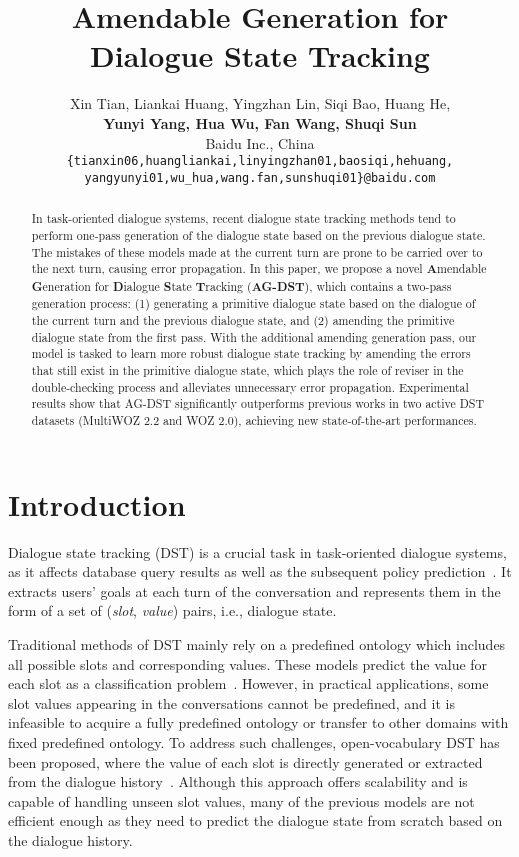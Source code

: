 \documentclass[11pt]{article}
\title{Amendable Generation for Dialogue State Tracking}
\author{Xin Tian, Liankai Huang, Yingzhan Lin, Siqi Bao, Huang He,\\
  \textbf{Yunyi Yang, Hua Wu, Fan Wang, Shuqi Sun} \\
  Baidu Inc., China \\
  \texttt{\{tianxin06,huangliankai,linyingzhan01,baosiqi,hehuang,} \\
  \texttt{yangyunyi01,wu\_hua,wang.fan,sunshuqi01\}@baidu.com}
}
\begin{document}
\maketitle
\begin{abstract}
In task-oriented dialogue systems, recent dialogue state tracking methods tend to perform one-pass generation of the dialogue state based on the previous dialogue state. The mistakes of these models made at the current turn are prone to be carried over to the next turn, causing error propagation. 
In this paper, we propose a novel \textbf{A}mendable \textbf{G}eneration for \textbf{D}ialogue \textbf{S}tate \textbf{T}racking (\textbf{AG-DST}), which contains a two-pass generation process: (1) generating a primitive dialogue state based on the dialogue of the current turn and the previous dialogue state, and (2) amending the primitive dialogue state from the first pass. 
With the additional amending generation pass, our model is tasked to learn more robust dialogue state tracking by amending the errors that still exist in the primitive dialogue state, which plays the role of reviser in the double-checking process and alleviates unnecessary error propagation.
Experimental results show that AG-DST significantly outperforms previous works in two active DST datasets (MultiWOZ 2.2 and WOZ 2.0), achieving new state-of-the-art performances.
\end{abstract}

\section{Introduction}

Dialogue state tracking (DST) is a crucial task in task-oriented dialogue systems, as it affects database query results as well as the subsequent policy prediction~\citep{chen2017survey}. It extracts users' goals at each turn of the conversation and represents them in the form of a set of (\textit{slot}, \textit{value}) pairs, i.e., dialogue state.

Traditional methods of DST mainly rely on a predefined ontology which includes all possible slots and corresponding values. These models predict the value for each slot as a classification problem~\citep{mrksic-etal-2017-neural,zhong-etal-2018-global,ramadan-etal-2018-large}. However, in practical applications, some slot values appearing in the conversations cannot be predefined, and it is infeasible to acquire a fully predefined ontology or transfer to other domains with fixed predefined ontology.
To address such challenges, open-vocabulary DST has been proposed, where the value of each slot is directly generated or extracted from the dialogue history~\citep{Chao2019,NEURIPS2020_e9462095,ham-etal-2020-end,heck-etal-2020-trippy}.
Although this approach offers scalability and is capable of handling unseen slot values, many of the previous models are not efficient enough as they need to predict the dialogue state from scratch based on the dialogue history.
\end{document}
